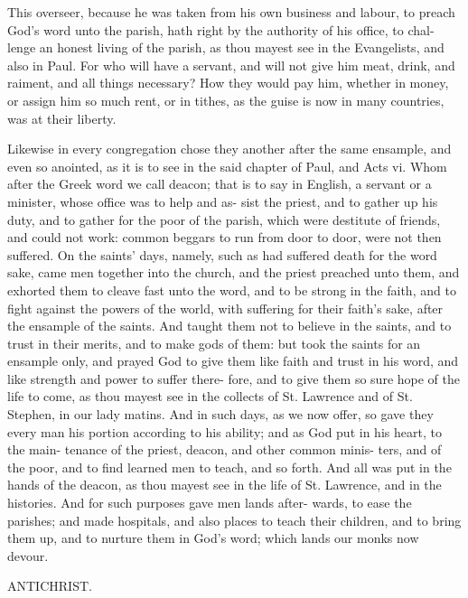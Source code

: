\documentclass{custom}
\begin{document}
This overseer, because he was taken from his own 
business and labour, to preach God's word unto the 
parish, hath right by the authority of his office, to chal- 
lenge an honest living of the parish, as thou mayest see 
in the Evangelists, and also in Paul. For who will have 
a servant, and will not give him meat, drink, and raiment, 
and all things necessary? How they would pay him, 
whether in money, or assign him so much rent, or in 
tithes, as the guise is now in many countries, was at their 
liberty. 

Likewise in every congregation chose they another after 
the same ensample, and even so anointed, as it is to see 
in the said chapter of Paul, and Acts vi. Whom after 
the Greek word we call deacon; that is to say in English, 
a servant or a minister, whose office was to help and as- 
sist the priest, and to gather up his duty, and to gather for 
the poor of the parish, which were destitute of friends, 
and could not work: common beggars to run from door 
to door, were not then suffered. On the saints' days, 
namely, such as had suffered death for the word sake, 
came men together into the church, and the priest preached 
unto them, and exhorted them to cleave fast unto the word, 
and to be strong in the faith, and to fight against the 
powers of the world, with suffering for their faith's sake, 
after the ensample of the saints. And taught them not to 
believe in the saints, and to trust in their merits, and to 
make gods of them: but took the saints for an ensample 
only, and prayed God to give them like faith and trust 
in his word, and like strength and power to suffer there- 
fore, and to give them so sure hope of the life to come, as 
thou mayest see in the collects of St. Lawrence and of St. 
Stephen, in our lady matins. And in such days, as we 
now offer, so gave they every man his portion according 
to his ability; and as God put in his heart, to the main- 
tenance of the priest, deacon, and other common minis- 
ters, and of the poor, and to find learned men to teach, 
and so forth. And all was put in the hands of the deacon, 
as thou mayest see in the life of St. Lawrence, and in the 
histories. And for such purposes gave men lands after- 
wards, to ease the parishes; and made hospitals, and also 
places to teach their children, and to bring them up, and 
to nurture them in God's word; which lands our monks 
now devour. 


ANTICHRIST.
\end{document}
